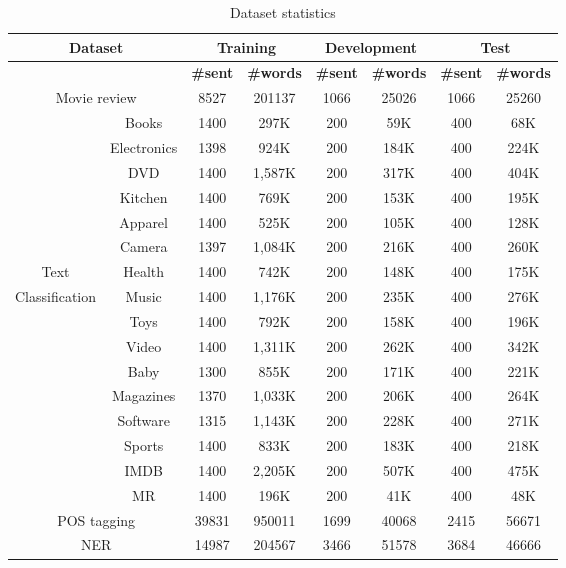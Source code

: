 \documentclass[11pt,a4paper]{article}
\begin{document}
\begin{table}[t]
	\centering
	\scriptsize
	\tabcolsep=0.03cm
	\begin{tabular}{|ccc|c|c|c|c|c|c|}
		\hline
		\multicolumn{3}{|c|}{\textbf{Dataset}} &\multicolumn{2}{|c|}{\textbf{Training}} &\multicolumn{2}{|c|}{\textbf{Development}}& \multicolumn{2}{|c|}{\textbf{Test}}\\
		\hline
		\multicolumn{3}{|c|}{} &\textbf{\#sent}&\textbf{\#words} &\textbf{\#sent}&\textbf{\#words}& \textbf{\#sent}&\textbf{\#words}\\
		\hline
		\multicolumn{3}{|c|}{Movie review \cite{pang2008opinion}} &8527&201137&1066&25026&1066&25260\\
		\hline
		  &  \multicolumn{2}{|c|}{Books} &1400 &297K&200&59K&400&68K\\
		  & \multicolumn{2}{|c|}{Electronics} &1398 &924K&200&184K&400&224K\\
		  & \multicolumn{2}{|c|}{DVD}&1400 &1,587K&200&317K&400&404K\\
		  & \multicolumn{2}{|c|}{Kitchen}&1400 &769K&200&153K&400&195K\\
		  & \multicolumn{2}{|c|}{Apparel}&1400 &525K&200&105K&400&128K\\
		  & \multicolumn{2}{|c|}{Camera}&1397 &1,084K&200&216K&400&260K\\
		Text  & \multicolumn{2}{|c|}{Health}&1400&742K&200&148K&400&175K\\
		Classification  & \multicolumn{2}{|c|}{Music}&1400 &1,176K&200&235K&400&276K\\
		\cite{liu2017adversarial}  & \multicolumn{2}{|c|}{Toys} &1400&792K&200&158K&400&196K\\
		  & \multicolumn{2}{|c|}{Video}& 1400 &1,311K&200&262K&400&342K\\
		  & \multicolumn{2}{|c|}{Baby}& 1300 &855K&200&171K&400&221K\\
		  & \multicolumn{2}{|c|}{Magazines}& 1370 &1,033K&200&206K&400&264K\\
		  & \multicolumn{2}{|c|}{Software}& 1315 &1,143K&200&228K&400&271K\\
		  & \multicolumn{2}{|c|}{Sports}& 1400 &833K&200&183K&400&218K\\
		  & \multicolumn{2}{|c|}{IMDB}& 1400 &2,205K&200&507K&400&475K\\
		  & \multicolumn{2}{|c|}{MR}& 1400 &196K&200&41K&400&48K\\
		\hline
		\multicolumn{3}{|c|}{POS tagging \cite{marcus1993building}}&39831&950011&1699&40068&2415&56671\\
		\hline
		\multicolumn{3}{|c|}{NER \cite{tjong2003introduction}}&14987&204567 &3466&51578&3684&46666\\
		
		\hline
	\end{tabular}
	\caption{\label{dataset_statistics}Dataset statistics}
\end{table}
\end{document}
